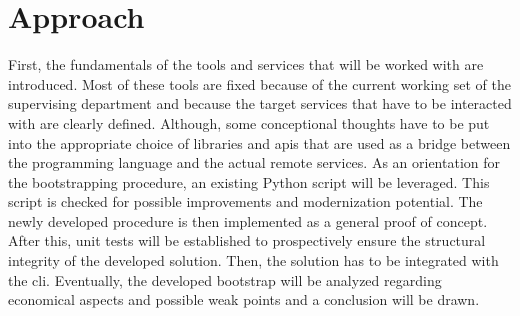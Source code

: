 \section{Approach}
First, the fundamentals of the tools and services that will be worked with are introduced.
Most of these tools are fixed because of the current working set of the supervising department and because the target services that have to be interacted with are clearly defined.
Although, some conceptional thoughts have to be put into the appropriate choice of libraries and \acp{api} that are used as a bridge between the programming language and the actual remote services.
As an orientation for the bootstrapping procedure, an existing Python script will be leveraged.
This script is checked for possible improvements and modernization potential.
The newly developed procedure is then implemented as a general proof of concept.
After this, unit tests will be established to prospectively ensure the structural integrity of the developed solution.
Then, the solution has to be integrated with the \ac{cli}.
Eventually, the developed bootstrap will be analyzed regarding economical aspects and possible weak points and a conclusion will be drawn.